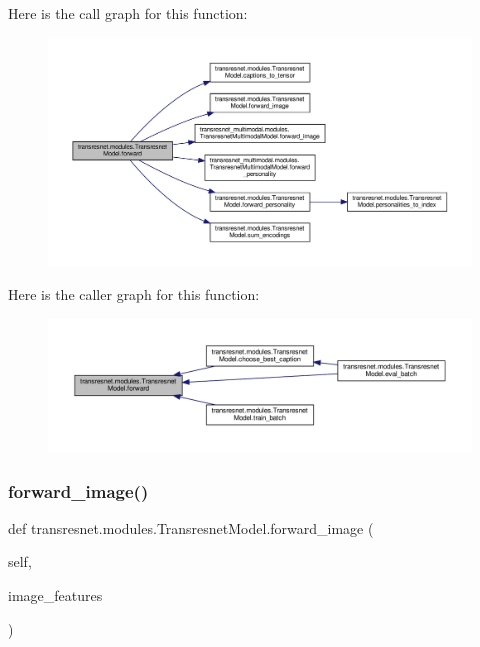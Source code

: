 Here is the call graph for this function\+:
\nopagebreak
\begin{figure}[H]
\begin{center}
\leavevmode
\includegraphics[width=350pt]{classtransresnet_1_1modules_1_1TransresnetModel_a371736aee24f40d0841a74aeb01f9145_cgraph}
\end{center}
\end{figure}
Here is the caller graph for this function\+:
\nopagebreak
\begin{figure}[H]
\begin{center}
\leavevmode
\includegraphics[width=350pt]{classtransresnet_1_1modules_1_1TransresnetModel_a371736aee24f40d0841a74aeb01f9145_icgraph}
\end{center}
\end{figure}
\mbox{\label{classtransresnet_1_1modules_1_1TransresnetModel_a578be5b044ee4d34d48541fdeb3ee947}} 
\subsubsection{\texorpdfstring{forward\+\_\+image()}{forward\_image()}}
{\footnotesize\ttfamily def transresnet.\+modules.\+Transresnet\+Model.\+forward\+\_\+image (\begin{DoxyParamCaption}\item[{}]{self,  }\item[{}]{image\+\_\+features }\end{DoxyParamCaption})}

